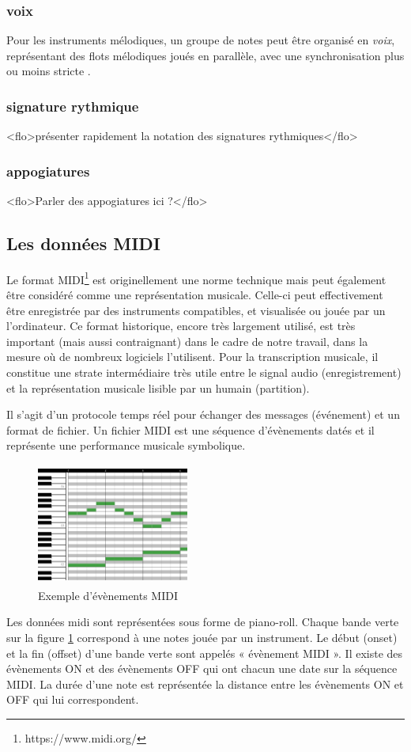 \subsubsection*{voix}
Pour les instruments mélodiques, un groupe de notes peut être organisé en
\emph{voix}, représentant des flots mélodiques joués en parallèle, avec une
synchronisation plus ou moins stricte \cite{SHIBATA2021262}
\cite{Guiomard-Kagan}.
\subsubsection*{signature rythmique}
\label{sign_rythm}
<flo>présenter rapidement la notation des signatures rythmiques</flo>
\subsubsection*{appogiatures}
<flo>Parler des appogiatures ici ?</flo>

\subsection*{Les données MIDI}
Le format MIDI\footnote{https://www.midi.org/} est originellement une norme
technique mais peut également être considéré comme une représentation musicale.
Celle-ci peut effectivement être enregistrée par des instruments compatibles,
et visualisée ou jouée par un l’ordinateur. Ce format historique, encore très
largement utilisé, est très important (mais aussi contraignant) dans le cadre
de notre travail, dans la mesure où de nombreux logiciels l'utilisent. Pour la
transcription musicale, il constitue une strate intermédiaire très utile entre
le signal audio (enregistrement) et la représentation musicale lisible par un
humain (partition).

Il s’agit d’un protocole temps réel pour échanger des messages (événement) et
un format de fichier. Un fichier MIDI est une séquence d’évènements datés et il
représente une performance musicale symbolique.

\begin{figure}[h]
	\centering
	\includegraphics[height=40mm, width=50mm]{
    z_images/1_contexte/2_midi_piano.jpg}
	\caption{Exemple d’évènements MIDI}
	\label{piano_roll}
\end{figure}
Les données midi sont représentées sous forme de piano-roll. Chaque bande verte
sur la figure \ref{piano_roll} correspond à une notes jouée par un instrument.
Le début (onset) et la fin (offset) d’une bande verte sont appelés « évènement
MIDI ». Il existe des évènements ON et des évènements OFF qui ont chacun une
date sur la séquence MIDI. La durée d’une note est représentée la distance
entre les évènements ON et OFF qui lui correspondent.\\


